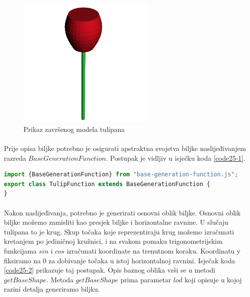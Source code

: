 \documentclass[times, utf8, diplomski]{fer}
\begin{document}
\begin{figure}[h]
	\centering
	\includegraphics[width=0.6\textwidth]{img/25-1}
	\caption{Prikaz završenog modela tulipana}
	\label{fig:25-1}
\end{figure}

\paragraph{}
Prije opisa biljke potrebno je osigurati apstraktna svojstva biljke naslijeđivanjem razreda
$BaseGenerationFunction$. Postupak je vidljiv u isječku koda \ref{code25-1}.

\begin{lstlisting}[language=Javascript,caption=Naslijeđivanje razreda BaseGenerationFunction,label=code25-1]
import {BaseGenerationFunction} from "base-generation-function.js";
export class TulipFunction extends BaseGenerationFunction {
}
\end{lstlisting}

\paragraph{}
Nakon naslijeđivanja, potrebno je generirati osnovni oblik biljke. Osnovni oblik biljke 
možemo zamisliti kao presjek biljke i horizontalne ravnine. U slučaju tulipana to je krug.
Skup točaka koje reprezentiraju krug možemo izračunati kretanjem po jediničnoj kružnici, i 
na svakom pomaku trigonometrijskim funkcijama $sin$ i $cos$ izračunati koordinate na 
trenutnom koraku. Koordinatu y fiksiramo na 0 za dobivanje točaka u istoj horizontalnoj 
ravnini. Isječak koda \ref{code25-2} prikazuje taj postupak. Opis baznog oblika vrši se u 
metodi $getBaseShape$. Metoda $getBaseShape$ prima parametar $lod$ koji opisuje u kojoj 
razini detalja generiramo biljku.
\end{document}
